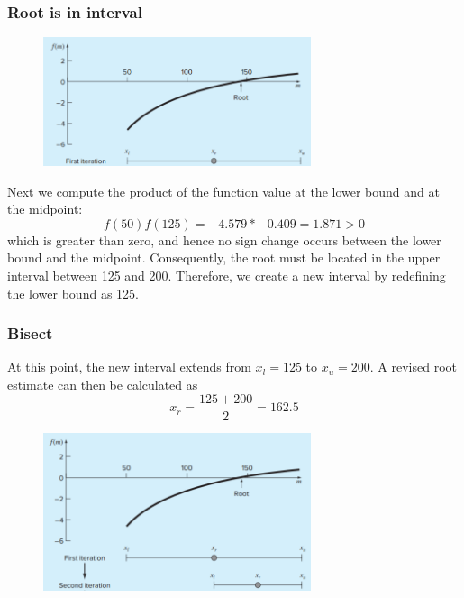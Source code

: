 \documentclass{if-beamer}
\begin{document}
\begin{frame}
\frametitle{Root is in interval}
\begin{figure}
	\center
	\includegraphics[width=0.7\textwidth]{figures/bracket.png}
\end{figure}
Next we compute the product of the function value at the lower bound and at the midpoint:
$$f(50)f(125) = −4.579*−0.409 = 1.871 > 0$$
which is greater than zero, and hence no sign change occurs between the lower bound and the midpoint. Consequently, the root must be located in the upper interval between 125 and 200. Therefore, we create a new interval by redefining the lower bound as 125.
\end{frame}

\begin{frame}
\frametitle{Bisect}
At this point, the new interval extends from $x_l = 125$ to $x_u = 200$. A revised root estimate can then be calculated as
$$ x_r = \frac{125+200}{2} = 162.5$$
\begin{figure}
\center
\includegraphics[width=0.7\textwidth]{figures/bracket2.png}
\end{figure}
\end{frame}
\end{document}
